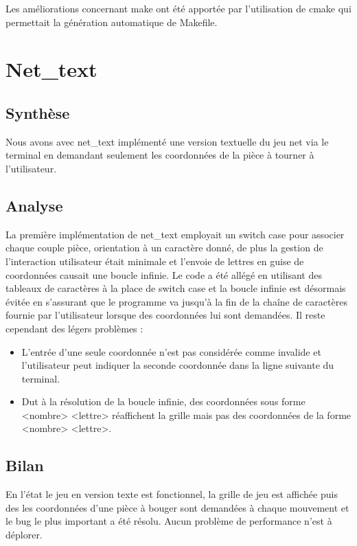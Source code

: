 \documentclass[12pt]{article}
\begin{document}
Les am\'eliorations concernant make ont \'et\'e apport\'ee par l'utilisation de cmake qui permettait la 
g\'en\'eration automatique de Makefile.



\section{Net\_text}
\subsection{Synth\`ese}

Nous avons avec net\_text impl\'ement\'e une version textuelle du jeu net via le terminal en demandant
seulement les coordonn\'ees de la pi\`ece \`a tourner \`a l'utilisateur.

\subsection{Analyse}

La premi\`ere impl\'ementation de net\_text employait un switch case pour associer chaque couple 
pi\`ece, orientation \`a un caract\`ere donn\'e, de plus la gestion de l'interaction utilisateur 
\'etait minimale et l'envoie de lettres en guise de coordonn\'ees causait une boucle infinie.
Le code a \'et\'e all\'eg\'e en utilisant des tableaux de caract\`eres \`a la place de switch case et 
la boucle infinie est d\'esormais \'evit\'ee en s'assurant que le programme va jusqu'\`a la fin de 
la chaîne de caract\`eres fournie par l'utilisateur lorsque des coordonn\'ees lui sont demand\'ees.
Il reste cependant des l\'egers probl\`emes : 
\begin{itemize}
\item L'entr\'ee d'une seule coordonn\'ee n'est pas consid\'er\'ee comme invalide et l'utilisateur peut indiquer la seconde coordonn\'ee dans la ligne suivante du terminal.
\item Dut \`a la r\'esolution de la boucle infinie, des coordonn\'ees sous forme <nombre> <lettre> r\'eaffichent la grille mais pas des coordonn\'ees de la forme <nombre> <lettre>.
\end{itemize}

\subsection{Bilan}

En l'\'etat le jeu en version texte est fonctionnel, la grille de jeu est affich\'ee puis des 
les coordonn\'ees d'une pi\`ece \`a bouger sont demand\'ees \`a chaque mouvement et le bug le plus 
important a \'et\'e r\'esolu. Aucun probl\`eme de performance n'est \`a d\'eplorer.
\end{document}
